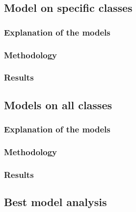 






\subsection{Model on specific classes}

\subsubsection{Explanation of the models}
\subsubsection{Methodology}
\subsubsection{Results}

\subsection{Models on all classes}
\subsubsection{Explanation of the models}
\subsubsection{Methodology}
\subsubsection{Results}

\subsection{Best model analysis}
